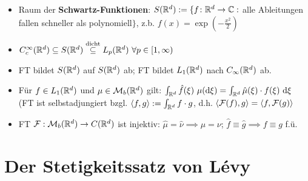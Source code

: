 \documentclass[12pt]{scrartcl}
\begin{document}
	\begin{itemize}
		\item Raum der \textbf{Schwartz-Funktionen}: $S(\mathbb{R}^d):=\lbrace f\colon\mathbb{R}^d\to\mathbb{C}:$ alle Ableitungen fallen schneller als polynomiell$\rbrace$, z.b. $f(x)=\exp(-\frac{x^2}{2})$
		\item $C_c^\infty(\mathbb{R}^d)\subseteq S(\mathbb{R}^d)\overset{\text{dicht}}{\subseteq} L_p(\mathbb{R}^d)~\forall p\in[1,\infty)$
		\item FT bildet $S(\mathbb{R}^d)$  auf $S(\mathbb{R}^d)$ ab;  FT bildet $L_1(\mathbb{R}^d)$ nach $C_\infty(\mathbb{R}^d)$ ab.
		\item {} Für $f\in L_1(\mathbb{R}^d)$ und $\mu\in\mathcal{M}_b(\mathbb{R}^d)$ gilt: $\int_{\mathbb{R}^d}\hat{f}(\xi)~\mu(\mathrm{d}\xi)=\int_{\mathbb{R}^d}\hat{\mu}(\xi)\cdot f(\xi)~\mathrm{d}\xi$ (FT ist selbstadjungiert bzgl. $\langle f,g\rangle:=\int_{\mathbb{R}^d} f\cdot g$, d.h. $\langle\mathcal{F}(f),g\rangle=\langle f,\mathcal{F}(g)\rangle$
		\item {} FT $\mathcal{F}:\mathcal{M}_b(\mathbb{R}^d)\to C(\mathbb{R}^d)$ ist injektiv: $\hat{\mu}=\hat{\nu}\implies \mu=\nu$; $\hat{f}\equiv\hat{g}\implies f\equiv g$ f.ü.
	\end{itemize}
	
	\section{Der Stetigkeitssatz von Lévy}
	
\end{document}
